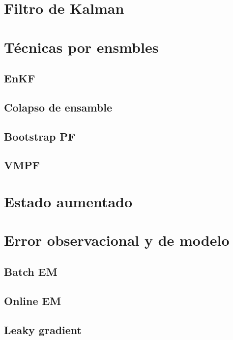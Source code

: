 \section{Filtro de Kalman}
\section{Técnicas por ensmbles}
    \subsection{EnKF}
    \subsection{Colapso de ensamble}
    \subsection{Bootstrap PF}
    \subsection{VMPF}
\section{Estado aumentado}
\section{Error observacional y de modelo}
    \subsection{Batch EM}
    \subsection{Online EM}
    \subsection{Leaky gradient}
